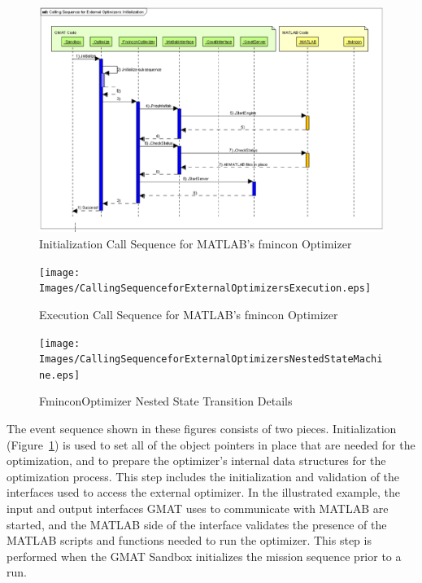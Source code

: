 \begin{subfigures}
\begin{figure}[htb]
\begin{center}
\includegraphics[scale=0.45]
{Images/CallingSequenceforExternalOptimizersInitialization.eps}
\caption{\label{figure:ExternalOptimizationCallSequenceInit}Initialization Call Sequence for
MATLAB's fmincon Optimizer}
\end{center}
\end{figure}

\begin{figure}
\begin{center}
\texttt{[image: Images/CallingSequenceforExternalOptimizersExecution.eps]}
\caption{\label{figure:ExternalOptimizationCallSequenceExec}Execution Call Sequence for MATLAB's
fmincon Optimizer}
\end{center}
\end{figure}

\begin{figure}
\begin{center}
\texttt{[image: Images/CallingSequenceforExternalOptimizersNestedStateMachine.eps]}
\caption{\label{figure:ExternalOptimizationCallSequenceNestedState}FminconOptimizer Nested State
Transition Details}
\end{center}
\end{figure}

\end{subfigures}

The event sequence shown in these figures consists of two pieces.  Initialization
(Figure~\ref{figure:ExternalOptimizationCallSequenceInit}) is used to set all of the object pointers
in place that are needed for the optimization, and to prepare the optimizer's internal data
structures for the optimization process.  This step includes the initialization and validation of
the interfaces used to access the external optimizer.  In the illustrated example, the input and
output interfaces GMAT uses to communicate with MATLAB are started, and the MATLAB side of the
interface validates the presence of the MATLAB scripts and functions needed to run the optimizer.
This step is performed when the GMAT Sandbox initializes the mission sequence prior to a run.

